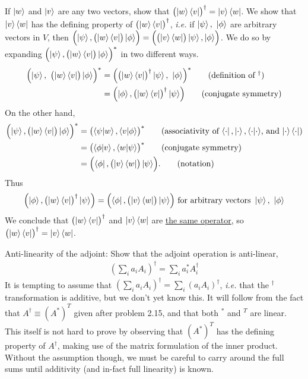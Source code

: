  If $\ket{w}$ and $\ket{v}$ are any two vectors, show that $\bigl(\ket{w}\bra{v}\bigr)^\dagger = \ket{v}\bra{w}$.
\Soln We show that $\ket{v}\bra{w}$ has the defining property of $\bigl(\ket{w}\bra{v}\bigr)^\dagger$, \textit{i.e.} if $\ket{\psi},\ \ket{\phi}$ are arbitrary vectors in $V$, then $\Bigl(\ket{\psi}, \bigl(\ket{w}\bra{v}\bigr)\ket{\phi}\Bigr) = \Bigl(\bigl(\ket{v}\bra{w}\bigr)\ket{\psi}, \ket{\phi}\Bigr)$.  We do so by expanding $\Bigl(\ket{\psi}, \bigl(\ket{w}\bra{v}\bigr)\ket{\phi}\Bigr)^*$ in two different ways. 
\begin{align*}
	\Bigl(\ket{\psi},\ \bigl(\ket{w}\bra{v}\bigr) \ket{\phi}\Bigr)^* &=
	\Bigl(\bigl(\ket{w}\bra{v}\bigr)^\dagger \ket{\psi},\  \ket{\phi}\Bigr)^* \tag{definition of $^\dagger$}\\
	&= \Bigl(\ket{\phi},\bigl(\ket{w}\bra{v}\bigr)^\dagger \ket{\psi} \Bigr) \tag{conjugate symmetry}
\end{align*}
On the other hand,
\begin{align*}
	\Bigl(\ket{\psi},\bigl(\ket{w}\bra{v}\bigr) \ket{\phi}\Bigr)^*
	&= \bigl(\braket{\psi | w}, \braket{v | \phi}\bigr)^* \tag{associativity of $\bra{\cdot},\ket{\cdot}, \braket{\cdot|\cdot}$, and $\ket{\cdot}\bra{\cdot}$}\\
	&= \bigl(\braket{\phi | v}, \braket{w | \psi}\bigr)^* \tag{conjugate symmetry}\\
	&= \Bigl(\bra{\phi}, \bigl(\ket{v}\bra{w}\bigr)\ket{\psi}\Bigr). \tag{notation}
\end{align*}
Thus
\begin{align*}
	\Bigl(\ket{\phi},\bigl(\ket{w}\bra{v}\bigr)^\dagger \ket{\psi} \Bigr) = \Bigl(\bra{\phi}, \bigl(\ket{v}\bra{w}\bigr)\ket{\psi}\Bigr) \text{ for arbitrary vectors } \ket{\psi},\ \ket{\phi}
\end{align*}
We conclude that $\bigl(\ket{w}\bra{v}\bigr)^\dagger$ and $\ket{v}\bra{w}$ are \underline{the same operator}, so $\bigl(\ket{w}\bra{v}\bigr)^\dagger = \ket{v}\bra{w}$.

 Anti-linearity of the adjoint: Show that the adjoint operation is anti-linear,
\begin{align*}\left(\sum_ia_iA_i\right)^\dagger = \sum_ia_i^*A_i^\dagger\end{align*}
\Soln It is tempting to assume that $\left(\sum_ia_iA_i\right)^\dagger = \sum_i(a_iA_i)^\dagger$, \textit{i.e.} that the $^\dagger$ transformation is additive, but we don't yet know this. It will follow from the fact that $A^\dagger \equiv (A^*)^T$ given after problem 2.15, and that both $^*$ and $^T$ are linear. This itself is not hard to prove by observing that $(A^*)^T$ has the defining property of $A^\dagger$, making use of the matrix formulation of the inner product.  Without the assumption though, we must be careful to carry around the full sums until additivity (and in-fact full linearity) is known.

